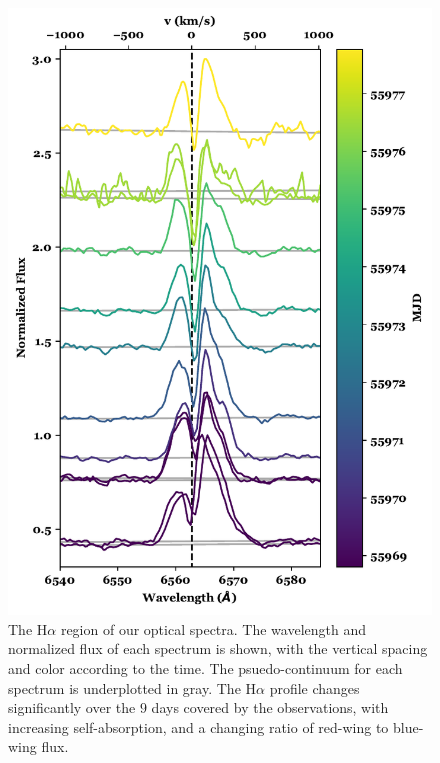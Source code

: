 \documentclass[twocolumn]{aastex631}
\newcommand\halpha{\ensuremath{{\text{H}\alpha}}}
\begin{document}
\begin{figure}[h]
    \centering
    \includegraphics[width=0.9\linewidth]{Figures/SU Aur/figure_halpha.pdf}
    \caption{The \halpha{} region of our optical spectra. The wavelength and normalized flux of each spectrum is shown, with the vertical spacing and color according to the time. The psuedo-continuum for each spectrum is underplotted in gray. The \halpha{} profile changes significantly over the $9$ days covered by the observations, with increasing self-absorption, and a changing ratio of red-wing to blue-wing flux.}
    \label{fig:halpha}
\end{figure}
\end{document}
